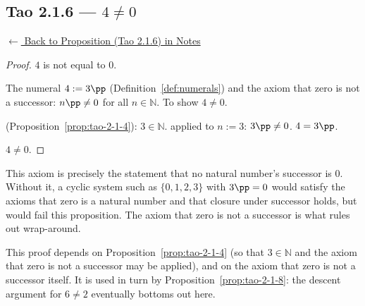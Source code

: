 
\subsection*{Tao 2.1.6 --- $4 \neq 0$}
\label{prf:tao-2-1-6}

\begin{remark*}[Return]
\hyperref[prop:tao-2-1-6]{$\leftarrow$ Back to Proposition (Tao 2.1.6) in Notes}
\end{remark*}

\begin{proof}
\Claim $4$ is not equal to $0$.

\Given The numeral $4 := 3\pp$ (Definition~\ref{def:numerals})
and the axiom that zero is not a successor: $n\pp \neq 0$ for all $n \in \mathbb{N}$.
\Goal To show $4 \neq 0$.

 (Proposition~\ref{prop:tao-2-1-4}): $3 \in \mathbb{N}$.
 applied to $n := 3$: $3\pp \neq 0$.
\ByDef $4 = 3\pp$.

\Hence $4 \neq 0$. \AsReq
\end{proof}

\begin{remark*}
This axiom is precisely the statement that no natural number's successor is $0$.
Without it, a cyclic system such as $\{0, 1, 2, 3\}$ with $3\pp = 0$ would satisfy
the axioms that zero is a natural number and that closure under successor holds,
but would fail this proposition. The axiom that zero is not a successor is what
rules out wrap-around.
\end{remark*}

\begin{remark*}[Dependencies]
This proof depends on Proposition~\ref{prop:tao-2-1-4} (so that $3 \in \mathbb{N}$
and the axiom that zero is not a successor may be applied), and on the
axiom that zero is not a successor itself.
It is used in turn by Proposition~\ref{prop:tao-2-1-8}: the descent argument for
$6 \neq 2$ eventually bottoms out here.
\end{remark*}
